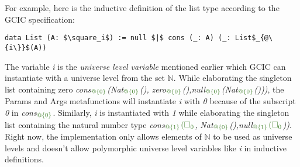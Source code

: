 \documentclass{article}
\theoremstyle{definition}
\newcommand{\Gcode}[1]{{\color{OliveGreen}\textit{#1}}}
\newcommand{\Gcmath}[1]{{\color{OliveGreen}#1}}
\newcommand{\Gcsub}[2]{\Gcode{#1}\(\Gcmath{_{#2}}\)}
\begin{document}
For example, here is the inductive definition of the list type according to the
GCIC specification:
\begin{lstlisting}[mathescape,label=lst:list-def-i, language=GCIC]
data List (A: $\square_i$) := null $|$ cons (_: A) (_: List$_{@\{i\}}$(A))
\end{lstlisting}
The variable \Gcode{i} is the \textit{universe level variable} mentioned earlier
which GCIC can instantiate with a universe level from the set \(\mathbb{N}\).
While elaborating the singleton list containing zero
\Gcsub{cons}{@\{0\}}\Gcsub{(Nat}{@\{0\}}\Gcode{(),}
\Gcsub{zero}{@\{0\}}\Gcsub{(),null}{@\{0\}}\Gcsub{(Nat}{@\{0\}}\Gcode{()))}, the
Params and Args metafunctions will instantiate \Gcode{i} with \Gcode{0} because
of the subscript \Gcode{0} in \Gcsub{cons}{@\{0\}}. Similarly, \Gcode{i} is
instantiated with \Gcode{1} while elaborating the singleton list containing the
natural number type \Gcsub{cons}{@\{1\}}\(\Gcmath{(\square_{0}}\)\Gcode{,}
\Gcsub{Nat}{@\{0\}}\Gcsub{(),null}{@\{1\}}\(\Gcmath{(\square_{0}}\)\Gcode{))}.
Right now, the implementation only allows elements of \(\mathbb{N}\) to be used
as universe levels and doesn't allow polymorphic universe level variables like
\Gcode{i} in inductive definitions.
\end{document}
